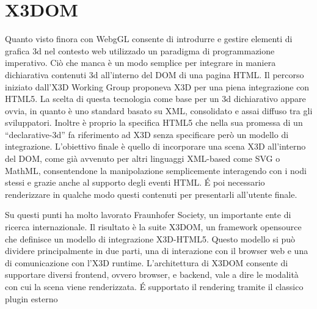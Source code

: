 \section{X3DOM}
Quanto visto finora con WebgGL consente di introdurre e gestire elementi di grafica 3d nel contesto web utilizzado un paradigma di programmazione imperativo. Ciò che manca è un modo semplice per integrare in maniera dichiarativa contenuti 3d all'interno del DOM di una pagina HTML. Il percorso iniziato dall'X3D Working Group proponeva X3D per una piena integrazione con HTML5. La scelta di questa tecnologia come base per un 3d dichiarativo appare ovvia, in quanto è uno standard basato su XML, consolidato e assai diffuso tra gli sviluppatori. Inoltre è proprio la specifica HTML5 che nella sua promessa di un ``declarative-3d'' fa riferimento ad X3D senza specificare però un modello di integrazione. L'obiettivo finale è quello di incorporare una scena X3D all'interno del DOM, come già avvenuto per altri linguaggi XML-based come SVG o MathML, consentendone la manipolazione semplicemente interagendo con i nodi stessi e grazie anche al supporto degli eventi HTML. \'{E} poi necessario renderizzare in qualche modo questi contenuti per presentarli all'utente finale. 

Su questi punti ha molto lavorato Fraunhofer Society, un importante ente di ricerca internazionale. Il risultato è la suite X3DOM, un framework opensource che definisce un modello di integrazione X3D-HTML5. Questo modello si può dividere principalmente in due parti, una di interazione con il browser web e una di comunicazione con l'X3D runtime. L'architettura di X3DOM consente di supportare diversi frontend, ovvero browser, e backend, vale a dire le modalità con cui la scena viene renderizzata. \'{E} supportato il rendering tramite il classico plugin esterno

